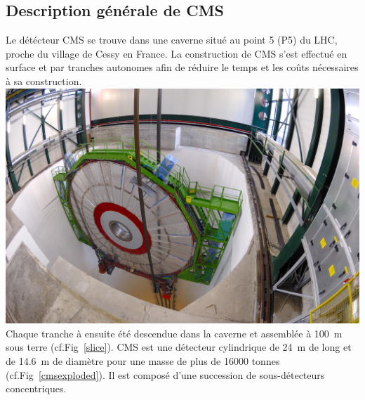 \subsection{Description générale de CMS}
Le détécteur CMS se trouve dans une caverne situé au point \num{5} (P5) du LHC, proche du village de Cessy en France. La construction de CMS s'est effectué en surface et par tranches autonomes afin de réduire le temps et les coûts nécessaires à sa construction.
\marginpar
{
	\centering
	\includegraphics[width=\marginparwidth]{CMS/slice.jpg}
	\label{slice}
}
Chaque tranche à ensuite été descendue dans la caverne et assemblée à \SI{100}{\meter} sous terre (cf.Fig~\ref{slice}).
CMS est une détecteur cylindrique de \SI{24}{\meter} de long et de \SI{14.6}{\meter} de diamètre pour une masse de plus de \num{16000} tonnes (cf.Fig~\ref{cmsexploded}). Il est composé d'une succession de sous-détecteurs concentriques.

